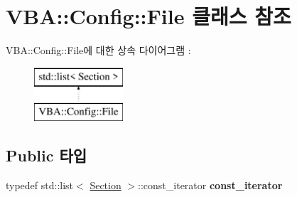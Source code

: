 \hypertarget{class_v_b_a_1_1_config_1_1_file}{}\section{V\+BA\+:\+:Config\+:\+:File 클래스 참조}
\label{class_v_b_a_1_1_config_1_1_file}
V\+BA\+:\+:Config\+:\+:File에 대한 상속 다이어그램 \+: \begin{figure}[H]
\begin{center}
\leavevmode
\includegraphics[height=2.000000cm]{class_v_b_a_1_1_config_1_1_file}
\end{center}
\end{figure}
\subsection*{Public 타입}
\begin{DoxyCompactItemize}
\item 
\mbox{\label{class_v_b_a_1_1_config_1_1_file_a3c4cd2c1e02bbe2dfff43c4e89c71edb}} 
typedef std\+::list$<$ \mbox{\hyperlink{class_v_b_a_1_1_config_1_1_section}{Section}} $>$\+::const\+\_\+iterator {\bfseries const\+\_\+iterator}
\end{DoxyCompactItemize}
